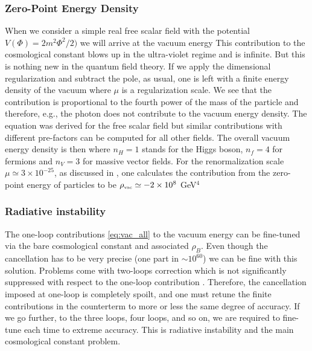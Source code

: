 \subsubsection{Zero-Point Energy Density}
When we consider a simple real free scalar field with the potential $V(\Phi)=2m^2\Phi^2/2)$ we will arrive at the vacuum energy
This contribution to the cosmological constant blows up in the ultra-violet regime and is infinite. But this is nothing new in the quantum field theory. If we apply the dimensional regularization \parencite{tHooft:1972tcz} and subtract the pole, as usual, one is left with a finite energy density of the vacuum
where $\mu$ is a regularization scale. We see that the contribution is proportional to the fourth power of the mass of the particle and therefore, e.g., the photon does not contribute to the vacuum energy density. The equation was derived for the free scalar field but similar contributions with different pre-factors can be computed for all other fields. The overall vacuum energy density is then
where $n_H=1$ stands for the Higgs boson, $n_f=4$ for fermions and $n_V=3$ for massive vector fields. For the renormalization scale $\mu\simeq3\times10^{-25}$, as discussed in \textcite{2011arXiv1105.6296K}, one calculates the contribution from the zero-point energy of particles to be  $\rho_\text{\tiny vac}\simeq-2\times10^8$ GeV$^4$
\subsubsection{Radiative instability}
The one-loop contributions \eqref{eq:vac_all} to the vacuum energy can be fine-tuned via the bare cosmological constant and associated $\rho_B$. Even though the cancellation has to be very precise (one part in $\sim10^{60}$) we can be fine with this solution. Problems come with two-loops correction which is not significantly suppressed with respect to the one-loop contribution \parencite{2012CRPhy..13..566M}. Therefore, the cancellation imposed at one-loop is completely spoilt, and one must retune the finite contributions in the counterterm to more or less the same degree of accuracy. If we go further, to the three loops, four loops, and so on, we are required to fine-tune each time to extreme accuracy. This is radiative instability and the main cosmological constant problem.

